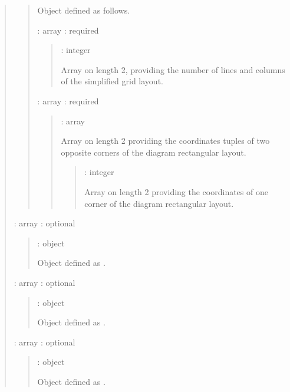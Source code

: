 \documentclass[letterpaper,10pt, openany,english]{sphinxmanual}
\begin{document}
\begin{quote}
\begin{quote}
Object defined as follows.

 : array : required
\begin{quote}

 : integer

Array on length 2, providing the number of lines and columns of the simplified grid layout.
\end{quote}

 : array : required
\begin{quote}

 : array

Array on length 2 providing the coordinates tuples of two opposite corners of the diagram rectangular layout.
\begin{quote}

 : integer

Array on length 2 providing the coordinates of one corner of the diagram rectangular layout.
\end{quote}
\end{quote}
\end{quote}

 : array : optional
\begin{quote}

 : object

Object defined as {\hyperref[\detokenize{requirements:elementary-object}]{}}.
\end{quote}

 : array : optional
\begin{quote}

 : object

Object defined as {\hyperref[\detokenize{requirements:elementary-object}]{}}.
\end{quote}

 : array : optional
\begin{quote}

 : object

Object defined as {\hyperref[\detokenize{requirements:elementary-object}]{}}.
\end{quote}
\end{quote}
\end{document}
